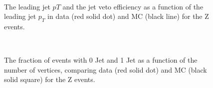 \begin{figure}[!hbtp]
\centering
{}
 \\
\caption{The leading jet $pT$  and the jet veto efficiency as a function 
of the leading jet $p_T$  in data (red solid dot) and MC (black line) for the Z events. }
\label{fig:jetveto_z}
\end{figure}

\begin{figure}[!hbtp]
\centering
{}
\\
\caption{The fraction of events with 0 Jet  and 1 Jet  
as a function of the number of vertices, comparing data (red solid dot) and MC (black solid square) for the Z events. }
\label{fig:jetfrac_z}
\end{figure}



